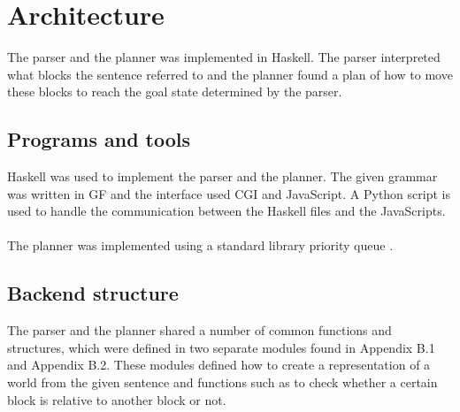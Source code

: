 \chapter{Architecture}
The parser and the planner was implemented in Haskell. The parser interpreted
what blocks the sentence referred to and the planner found a plan of how to
move these blocks to reach the goal state determined by the parser. 

\section{Programs and tools}
Haskell was used to implement the parser and the planner. The given grammar was
written in GF and the interface used CGI and JavaScript. A Python script is
used to handle the communication between the Haskell files and the JavaScripts.
\\\\
The planner was implemented using a standard library priority queue \citep{psq_url}. 

\section{Backend structure}
The parser and the planner shared a number of common functions and structures,
which were defined in two separate modules found in Appendix B.1 and Appendix
B.2. These modules defined how to create a representation of a world from the
given sentence and functions such as to check whether a certain block is
relative to another block or not. 

